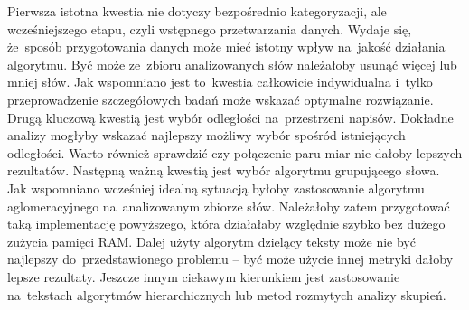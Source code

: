 \documentclass{praca1}
\begin{document}
Pierwsza istotna kwestia nie dotyczy bezpośrednio kategoryzacji, ale wcześniejszego etapu, czyli wstępnego przetwarzania danych. Wydaje się, że~sposób przygotowania danych może mieć istotny wpływ na~jakość działania algorytmu. Być może ze~zbioru analizowanych słów należałoby usunąć więcej lub mniej słów. Jak wspomniano jest to~kwestia całkowicie indywidualna i~tylko przeprowadzenie szczegółowych badań może wskazać optymalne rozwiązanie. Drugą kluczową kwestią jest wybór odległości na~przestrzeni napisów. Dokładne analizy mogłyby wskazać najlepszy możliwy wybór spośród istniejących odległości. Warto również sprawdzić czy połączenie paru miar nie dałoby lepszych rezultatów. Następną ważną kwestią jest wybór algorytmu grupującego słowa. Jak wspomniano wcześniej idealną sytuacją byłoby zastosowanie algorytmu aglomeracyjnego na~analizowanym zbiorze słów. Należałoby zatem przygotować taką implementację powyższego, która działałaby względnie szybko bez dużego zużycia pamięci RAM. Dalej użyty algorytm dzielący teksty może nie być najlepszy do~przedstawionego problemu -- być może użycie innej metryki dałoby lepsze rezultaty. Jeszcze innym ciekawym kierunkiem jest zastosowanie na~tekstach algorytmów hierarchicznych lub metod rozmytych analizy skupień.






\end{document}
